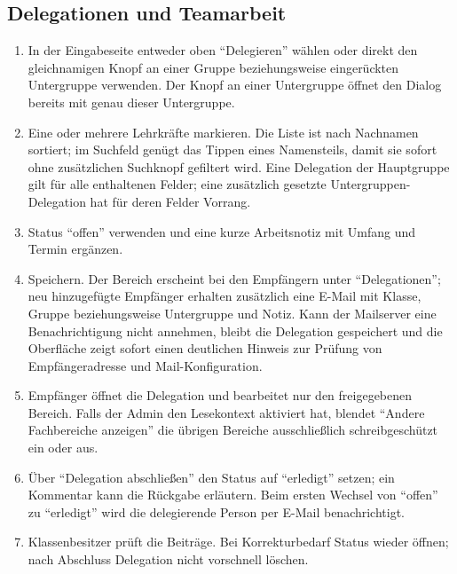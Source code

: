 \documentclass[12pt,a4paper]{article}
\begin{document}
\subsection*{Delegationen und Teamarbeit}
\begin{enumerate}
  \item In der Eingabeseite entweder oben \enquote{Delegieren} wählen oder direkt den gleichnamigen Knopf an einer Gruppe beziehungsweise eingerückten Untergruppe verwenden. Der Knopf an einer Untergruppe öffnet den Dialog bereits mit genau dieser Untergruppe.
  \item Eine oder mehrere Lehrkräfte markieren. Die Liste ist nach Nachnamen sortiert; im Suchfeld genügt das Tippen eines Namensteils, damit sie sofort ohne zusätzlichen Suchknopf gefiltert wird. Eine Delegation der Hauptgruppe gilt für alle enthaltenen Felder; eine zusätzlich gesetzte Untergruppen-Delegation hat für deren Felder Vorrang.
  \item Status \enquote{offen} verwenden und eine kurze Arbeitsnotiz mit Umfang und Termin ergänzen.
  \item Speichern. Der Bereich erscheint bei den Empfängern unter \enquote{Delegationen}; neu hinzugefügte Empfänger erhalten zusätzlich eine E-Mail mit Klasse, Gruppe beziehungsweise Untergruppe und Notiz. Kann der Mailserver eine Benachrichtigung nicht annehmen, bleibt die Delegation gespeichert und die Oberfläche zeigt sofort einen deutlichen Hinweis zur Prüfung von Empfängeradresse und Mail-Konfiguration.
  \item Empfänger öffnet die Delegation und bearbeitet nur den freigegebenen Bereich. Falls der Admin den Lesekontext aktiviert hat, blendet \enquote{Andere Fachbereiche anzeigen} die übrigen Bereiche ausschließlich schreibgeschützt ein oder aus.
  \item Über \enquote{Delegation abschließen} den Status auf \enquote{erledigt} setzen; ein Kommentar kann die Rückgabe erläutern. Beim ersten Wechsel von \enquote{offen} zu \enquote{erledigt} wird die delegierende Person per E-Mail benachrichtigt.
  \item Klassenbesitzer prüft die Beiträge. Bei Korrekturbedarf Status wieder öffnen; nach Abschluss Delegation nicht vorschnell löschen.
\end{enumerate}
\end{document}
